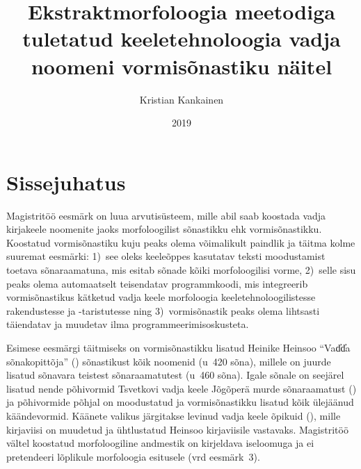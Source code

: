 \documentclass[12pt,a4paper]{article}
\begin{document}
\title{Ekstraktmorfoloogia meetodiga tuletatud keeletehnoloogia vadja noomeni vormisõnastiku näitel}
\author{Kristian Kankainen}
\date{2019}
\maketitle


\newpage
\tableofcontents




\newpage
{}
\section{Sissejuhatus}
\label{sissejuhatus}


Magistritöö eesmärk on luua arvuti\-süsteem, mille abil saab koostada vadja kirja\-keele noomenite jaoks morfoloogilist sõnastikku ehk vormisõnastikku. Koostatud vormisõnastiku kuju peaks olema võimalikult paindlik ja täitma kolme suuremat eesmärki: 1)~see oleks keeleõppes kasutatav teksti moodustamist toetava sõnaraamatuna, mis esitab sõnade kõiki morfoloogilisi vorme, 2)~selle sisu peaks olema automaatselt teisendatav programm\-koodi,
mis integreerib vormisõnastikus kätketud vadja keele morfoloogia keele\-tehnoloogilistesse rakendustesse ja -taristutesse ning 3)~vormisõnastik peaks olema lihtsasti täiendatav ja muudetav ilma programmeerimis\-oskusteta.

Esimese eesmärgi täitmiseks on vormi\-sõnastikku lisatud Heinike Heinsoo \enquote{\mbox{Vad̕d̕a} sõnakopittõja} (\citeyear{heinsoo_vadsonakopittoja_2015}) sõnastikust kõik noomenid (u~420 sõna), millele on juurde lisatud sõnavara teistest sõnaraamatutest (u~460 sõna). Igale sõnale on see\-järel lisatud nende põhivormid Tsvetkovi vadja keele Jõgõperä murde sõnaraamatust (\cite{laakso_vatjan_1989}) ja põhi\-vormide põhjal on moodustatud ja vormi\-sõnastikku lisatud kõik ülejäänud käändevormid. Käänete valikus järgitakse levinud vadja keele õpikuid (\cites{heinsoo_vadsonakopittoja_2015}{konkova_vaddceeli_2014}), mille kirja\-viisi on muudetud ja ühtlustatud Heinsoo kirjaviisile vastavaks. Magistritöö vältel koostatud morfoloogiline andmestik on kirjeldava iseloomuga ja ei pretendeeri lõplikule morfoloogia esitusele (vrd eesmärk~3).
\end{document}
